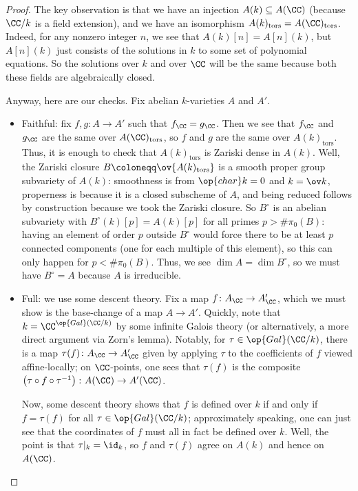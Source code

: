 \documentclass[../notes.tex]{subfiles}
\begin{document}
\begin{proof}
	The key observation is that we have an injection $A(k)\subseteq A(\CC)$ (because $\CC/k$ is a field extension), and we have an isomorphism $A(k)_{\mathrm{tors}}=A(\CC)_{\mathrm{tors}}$. Indeed, for any nonzero integer $n$, we see that $A(k)[n]=A[n](k)$, but $A[n](k)$ just consists of the solutions in $k$ to some set of polynomial equations. So the solutions over $k$ and over $\CC$ will be the same because both these fields are algebraically closed.

	Anyway, here are our checks. Fix abelian $k$-varieties $A$ and $A'$.
	\begin{itemize}
		\item Faithful: fix $f,g\colon A\to A'$ such that $f_\CC=g_\CC$. Then we see that $f_\CC$ and $g_\CC$ are the same over $A(\CC)_{\mathrm{tors}}$, so $f$ and $g$ are the same over $A(k)_{\mathrm{tors}}$. Thus, it is enough to check that $A(k)_{\mathrm{tors}}$ is Zariski dense in $A(k)$. Well, the Zariski closure $B\coloneqq\ov{A(k)_{\mathrm{tors}}}$ is a smooth proper group subvariety of $A(k)$: smoothness is from $\op{char}k=0$ and $k=\ov k$, properness is because it is a closed subscheme of $A$, and being reduced follows by construction because we took the Zariski closure. So $B^\circ$ is an abelian subvariety with $B^\circ(k)[p]=A(k)[p]$ for all primes $p>\#\pi_0(B)$: having an element of order $p$ outside $B^\circ$ would force there to be at least $p$ connected components (one for each multiple of this element), so this can only happen for $p<\#\pi_0(B)$. Thus, we see $\dim A=\dim B^\circ$, so we must have $B^\circ=A$ because $A$ is irreducible.

		\item Full: we use some descent theory. Fix a map $f\colon A_\CC\to A'_\CC$, which we must show is the base-change of a map $A\to A'$. Quickly, note that $k=\CC^{\op{Gal}(\CC/k)}$ by some infinite Galois theory (or alternatively, a more direct argument via Zorn's lemma). Notably, for $\tau\in\op{Gal}(\CC/k)$, there is a map $\tau(f)\colon A_\CC\to A'_\CC$ given by applying $\tau$ to the coefficients of $f$ viewed affine-locally; on $\CC$-points, one sees that $\tau(f)$ is the composite $\left(\tau\circ f\circ\tau^{-1}\right)\colon A(\CC)\to A'(\CC)$.

		Now, some descent theory shows that $f$ is defined over $k$ if and only if $f=\tau(f)$ for all $\tau\in\op{Gal}(\CC/k)$; approximately speaking, one can just see that the coordinates of $f$ must all in fact be defined over $k$. Well, the point is that $\tau|_k=\id_k$, so $f$ and $\tau(f)$ agree on $A(k)$ and hence on $A(\CC)$.


\end{itemize}
\end{proof}
\end{document}
